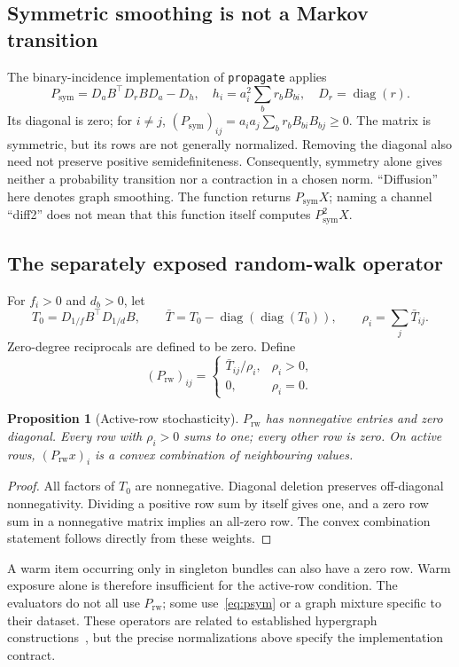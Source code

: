 \documentclass[11pt,a4paper]{article}
\newtheorem{proposition}[theorem]{Proposition}
\theoremstyle{remark}
\newcommand{\diag}{\operatorname{diag}}
\newcommand{\code}[1]{\texttt{\small #1}}
\begin{document}
\subsection{Symmetric smoothing is not a Markov transition}
The binary-incidence implementation of \code{propagate} applies
\begin{equation}
 P_{\mathrm{sym}}=D_a B^\top D_r B D_a-D_h,
 \quad h_i=a_i^2\sum_b r_b B_{bi},\quad D_r=\diag(r).
 \label{eq:psym}
\end{equation}
Its diagonal is zero; for $i\neq j$,
$(P_{\mathrm{sym}})_{ij}=a_i a_j\sum_b r_b B_{bi}B_{bj}\geq0$.
The matrix is symmetric, but its rows are not generally normalized.
Removing the diagonal also need not preserve positive semidefiniteness.
Consequently, symmetry alone gives neither a probability transition nor
a contraction in a chosen norm. ``Diffusion'' here denotes graph smoothing.
The function returns $P_{\mathrm{sym}}X$; naming a channel ``diff2'' does
not mean that this function itself computes $P_{\mathrm{sym}}^2X$.

\subsection{The separately exposed random-walk operator}
For $f_i>0$ and $d_b>0$, let
\begin{equation}
 T_0=D_{1/f} B^\top D_{1/d} B,\qquad
 \bar T=T_0-\diag(\diag(T_0)),\qquad
 \rho_i=\sum_j\bar T_{ij}.
\end{equation}
Zero-degree reciprocals are defined to be zero. Define
\begin{equation}
 (P_{\mathrm{rw}})_{ij}=\begin{cases}
   \bar T_{ij}/\rho_i,&\rho_i>0,\\
   0,&\rho_i=0.
 \end{cases}
 \label{eq:prw}
\end{equation}
\begin{proposition}[Active-row stochasticity]
$P_{\mathrm{rw}}$ has nonnegative entries and zero diagonal. Every row with
$\rho_i>0$ sums to one; every other row is zero. On active rows,
$(P_{\mathrm{rw}}x)_i$ is a convex combination of neighbouring values.
\end{proposition}
\begin{proof}
All factors of $T_0$ are nonnegative. Diagonal deletion preserves off-diagonal
nonnegativity. Dividing a positive row sum by itself gives one, and a
zero row sum in a nonnegative matrix implies an all-zero row. The convex
combination statement follows directly from these weights.
\end{proof}
A warm item occurring only in singleton bundles can also have a zero row.
Warm exposure alone is therefore insufficient for the active-row condition.
The evaluators do not all use $P_{\mathrm{rw}}$; some use~\eqref{eq:psym}
or a graph mixture specific to their dataset. These operators are related
to established hypergraph constructions~\cite{zhou2006}, but the precise
normalizations above specify the implementation contract.
\end{document}
